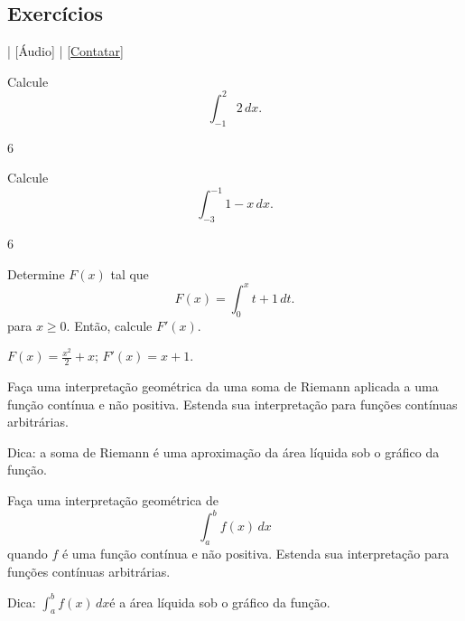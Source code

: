 \subsection*{Exercícios}

\begin{flushright}
  [Vídeo] | [Áudio] | \href{https://phkonzen.github.io/notas/contato.html}{[Contatar]}
\end{flushright}

\begin{exer}
  Calcule
  \begin{equation}
    \int_{-1}^2 2\,dx.
  \end{equation}
\end{exer}
\begin{resp}
  $6$
\end{resp}

\begin{exer}
  Calcule
  \begin{equation}
    \int_{-3}^{-1} 1-x\,dx.
  \end{equation}
\end{exer}
\begin{resp}
  $6$
\end{resp}

\begin{exer}
  Determine $F(x)$ tal que
  \begin{equation}
    F(x) = \int_{0}^{x} t+1\,dt.
  \end{equation}
  para $x\geq 0$. Então, calcule $F'(x)$.
\end{exer}
\begin{resp}
  $\displaystyle F(x) = \frac{x^2}{2} + x$; $F'(x) = x + 1$.
\end{resp}

\begin{exer}\label{exer:int_geoRiemann}
  Faça uma interpretação geométrica da uma soma de Riemann aplicada a uma função contínua e não positiva. Estenda sua interpretação para funções contínuas arbitrárias.
\end{exer}
\begin{resp}
  Dica: a soma de Riemann é uma aproximação da área líquida sob o gráfico da função.
\end{resp}

\begin{exer}\label{exer:int_geointdef}
  Faça uma interpretação geométrica de
  \begin{equation}
    \int_a^b f(x)\,dx
  \end{equation}
  quando $f$ é uma função contínua e não positiva. Estenda sua interpretação para funções contínuas arbitrárias.
\end{exer}
\begin{resp}
  Dica: $\displaystyle \int_a^b f(x)\,dx$é a área líquida sob o gráfico da função.
\end{resp}

